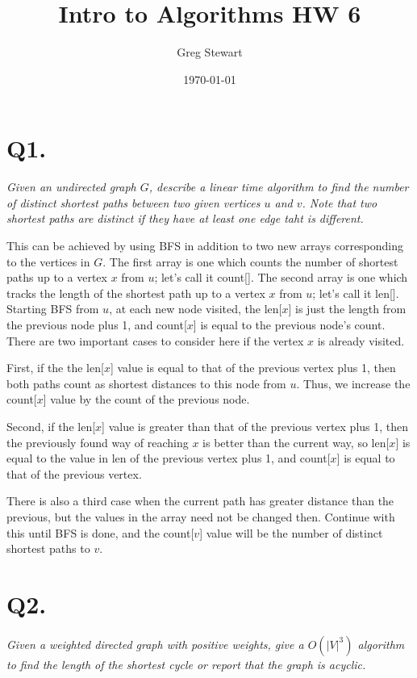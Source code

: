 \documentclass{article}
\title{Intro to Algorithms HW 6}
\author{Greg Stewart}
\date{\today}
\begin{document}
\maketitle

\section*{Q1. }

\textit{Given an undirected graph $G$, describe a linear time algorithm to find the number of distinct shortest paths between two given vertices $u$ and $v$. Note that two shortest paths are distinct if they have at least one edge taht is different.}

This can be achieved by using BFS in addition to two new arrays corresponding to the vertices in $G$. The first array is one which counts the number of shortest paths up to a vertex $x$ from $u$; let's call it count[]. The second array is one which tracks the length of the shortest path up to a vertex $x$ from $u$; let's call it len[]. Starting BFS from $u$, at each new node visited, the len[$x$] is just the length from the previous node plus 1, and count[$x$] is equal to the previous node's count. There are two important cases to consider here if the vertex $x$ is already visited.

First, if the the len[$x$] value is equal to that of the previous vertex plus 1, then both paths count as shortest distances to this node from $u$. Thus, we increase the count[$x$] value by the count of the previous node.

Second, if the len[$x$] value is greater than that of the previous vertex plus 1, then the previously found way of reaching $x$ is better than the current way, so len[$x$] is equal to the value in len of the previous vertex plus 1, and count[$x$] is equal to that of the previous vertex.

There is also a third case when the current path has greater distance than the previous, but the values in the array need not be changed then. Continue with this until BFS is done, and the count[$v$] value will be the number of distinct shortest paths to $v$.





\section*{Q2. }

\textit{Given a weighted directed graph with positive weights, give a $O(|V|^3)$ algorithm to find the length of the shortest cycle or report that the graph is acyclic.}
\end{document}
